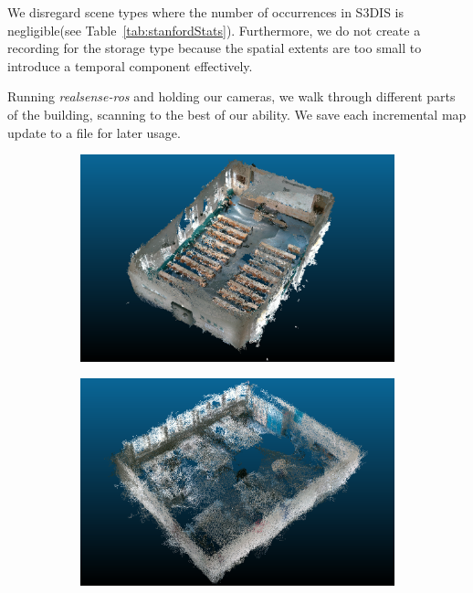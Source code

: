 \documentclass[main.tex]{subfiles}
\begin{document}
We disregard scene types where the number of occurrences in S3DIS is negligible(see Table~\ref{tab:stanfordStats}).
Furthermore, we do not create a recording for the storage type because the spatial extents are too small to introduce a temporal component effectively.

Running \textit{realsense-ros} and holding our cameras, we walk through different parts of the building, scanning to the best of our ability.
We save each incremental map update to a file for later usage.

\begin{figure}[H]
    \begin{subfigure}{0.5\textwidth}
        \centering
        \includegraphics[width=.9\linewidth]{images/307.png}
        \caption[Dynamic Dataset - auditorium]{}
        \label{fig:fin307}
    \end{subfigure}
    \begin{subfigure}{0.5\textwidth}
        \centering
        \includegraphics[width=.9\linewidth]{images/333.png}
        \caption[Dynamic Dataset - conference room]{}

\end{subfigure}
\end{figure}
\end{document}

